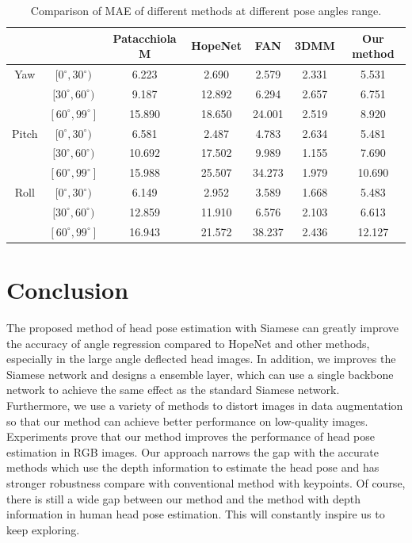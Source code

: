 \documentclass[english]{DDCLSconf}
\begin{document}
\begin{table}[!tbp]
	\caption{Comparison of MAE of different methods at different pose angles range.}
	\label{different_pose_compare}       %
	\centering
	\begin{tabular}{ccccccc}
		\toprule
		\quad & \quad & Patacchiola M & HopeNet & FAN & 3DMM & Our method\\
		\midrule
		Yaw & $[0^{\circ}, 30^{\circ})$ & 6.223 & 2.690 & 2.579 & 2.331 & 5.531 \\
		\quad & $[30^{\circ}, 60^{\circ})$ & 9.187 & 12.892 & 6.294 & 2.657 & 6.751 \\
		\quad & $[60^{\circ}, 99^{\circ}]$ & 15.890 & 18.650 & 24.001 & 2.519 & 8.920 \\
		
		Pitch & $[0^{\circ}, 30^{\circ})$ & 6.581 & 2.487 & 4.783 & 2.634 & 5.481 \\
		\quad & $[30^{\circ}, 60^{\circ})$ & 10.692 & 17.502 & 9.989 & 1.155 & 7.690 \\
		\quad & $[60^{\circ}, 99^{\circ}]$ & 15.988 & 25.507 & 34.273 & 1.979 & 10.690 \\
		
		Roll & $[0^{\circ}, 30^{\circ})$ & 6.149 & 2.952 & 3.589 & 1.668 & 5.483 \\
		\quad & $[30^{\circ}, 60^{\circ})$ & 12.859 & 11.910 & 6.576 & 2.103 & 6.613 \\
		\quad & $[60^{\circ}, 99^{\circ}]$ & 16.943 & 21.572 & 38.237 & 2.436 & 12.127 \\
		
		\bottomrule
	\end{tabular}
\end{table}


\section{Conclusion}
The proposed method of head pose estimation with Siamese can greatly improve the accuracy of angle regression compared to HopeNet and other methods, especially in the large angle deflected head images. In addition, we improves the Siamese network and designs a ensemble layer, which can use a single backbone network to achieve the same effect as the standard Siamese network. Furthermore, we use a variety of methods to distort images in data augmentation so that our method can achieve better performance on low-quality images. Experiments prove that our method improves the performance of head pose estimation in RGB images. Our approach narrows the gap with the accurate methods which use the depth information to estimate the head pose and has stronger robustness compare with conventional method with keypoints. Of course, there is still a wide gap between our method and the method with depth information in human head pose estimation. This will constantly inspire us to keep exploring.
\end{document}
